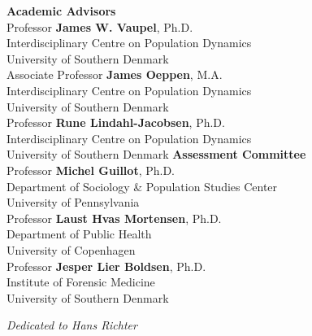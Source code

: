 \documentclass[
  10pt, twoside
]{book}
\begin{document}
{\noindent\footnotesize
  \textbf{\Large Academic Advisors}
  \vspace{0.5cm}\\
  Professor \textbf{James W. Vaupel}, Ph.D.\\
  Interdisciplinary Centre on Population Dynamics\\
  University of Southern Denmark
  \vspace{0.4cm}\\
  Associate Professor \textbf{James Oeppen}, M.A.\\
  Interdisciplinary Centre on Population Dynamics\\
  University of Southern Denmark
  \vspace{0.4cm}\\
  Professor \textbf{Rune Lindahl-Jacobsen}, Ph.D.\\
  Interdisciplinary Centre on Population Dynamics\\
  University of Southern Denmark
}
\vfill
{\noindent\footnotesize
  \textbf{\Large Assessment Committee}
  \vspace{0.5cm}\\
  Professor \textbf{Michel Guillot}, Ph.D.\\
  Department of Sociology \& Population Studies Center\\
  University of Pennsylvania
  \vspace{0.4cm}\\
  Professor \textbf{Laust Hvas Mortensen}, Ph.D.\\
  Department of Public Health\\
  University of Copenhagen
  \vspace{0.4cm}\\
  Professor \textbf{Jesper Lier Boldsen}, Ph.D.\\
  Institute of Forensic Medicine\\
  University of Southern Denmark
}

\clearpage


{
\itshape
\raggedleft
Dedicated to Hans Richter
\par
{}
}
   
\clearpage


\end{document}
